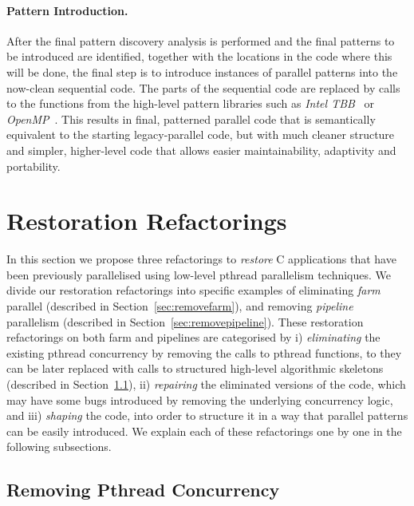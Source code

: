 \paragraph{Pattern Introduction.}
After the final pattern discovery analysis is performed and the final patterns to be introduced are identified, together with the locations in the code where this will be done, the final step is to introduce instances of parallel patterns into the now-clean sequential code. The parts of the sequential code are replaced by calls to the functions from the high-level pattern libraries such as \emph{Intel TBB}~\cite{DBLP:reference/parallel/X11pz} or \emph{OpenMP}~\cite{10.1109/99.660313}. This results in final, patterned parallel code that is semantically equivalent to the starting legacy-parallel code, but with much cleaner structure and simpler, higher-level code that allows easier maintainability, adaptivity and portability.

\section{Restoration Refactorings} \label{sec:refactoring}

In this section we propose three refactorings to \emph{restore} C applications that have been previously parallelised using low-level pthread parallelism techniques. We divide our restoration refactorings into specific examples of eliminating \emph{farm} parallel (described in Section~\ref{sec:removefarm}), and removing \emph{pipeline} parallelism (described in Section~\ref{sec:removepipeline}).
These restoration refactorings on both farm and pipelines are categorised by i) \emph{eliminating} the existing pthread concurrency by removing the calls to pthread functions, to they can be later replaced with calls to structured high-level algorithmic skeletons (described in Section~\ref{sec:removepthread}), ii) \emph{repairing} the eliminated versions of the code, which may have some bugs introduced by removing the underlying concurrency logic, and iii) \emph{shaping} the code, into order to structure it in a way that parallel patterns can be easily introduced. 
We explain each of these refactorings one by one in the following subsections.

\subsection{Removing Pthread Concurrency} \label{sec:removepthread}



